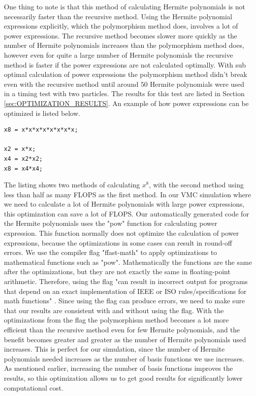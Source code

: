 \documentclass[../main.tex]{subfiles}
\begin{document}
One thing to note is that this method of calculating Hermite polynomials is not necessarily faster than the recursive method. Using the Hermite polynomial expressions explicitly, which the polymorphism method does, involves a lot of power expressions. The recursive method becomes slower more quickly as the number of Hermite polynomials increases than the polymorphism method does, however even for quite a large number of Hermite polynomials the recursive method is faster if the power expressions are not calculated optimally. With sub optimal calculation of power expressions the polymorphism method didn't break even with the recursive method until around $50$ Hermite polynomials were used in a timing test with two particles. The results for this test are listed in Section \ref{sec:OPTIMIZATION_RESULTS}. An example of how power expressions can be optimized is listed below.
\lstset{language=c++}
\begin{lstlisting}[caption={Two methods for calculating $x^8$. The first method uses $7$ FLOPS, while the second method uses only $3$ FLOPS.}]
x8 = x*x*x*x*x*x*x*x;

x2 = x*x;
x4 = x2*x2;
x8 = x4*x4;
\end{lstlisting}
The listing shows two methods of calculating $x^8$, with the second method using less than half as many FLOPS as the first method. In our VMC simulation where we need to calculate a lot of Hermite polynomials with large power expressions, this optimization can save a lot of FLOPS. Our automatically generated code for the Hermite polynomials uses the "pow" function for calculating power expression. This function normally does not optimize the calculation of power expressions, because the optimizations in some cases can result in round-off errors. We use the compiler flag "ffast-math" to apply optimizations to mathematical functions such as "pow". Mathematically the functions are the same after the optimizations, but they are not exactly the same in floating-point arithmetic. Therefore, using the flag "can result in incorrect output for programs that depend on an exact implementation of IEEE or ISO rules/specifications for math functions" \cite{gccDocs}. Since using the flag can produce errors, we need to make sure that our results are consistent with and without using the flag. With the optimizations from the flag the polymorphism method becomes a lot more efficient than the recursive method even for few Hermite polynomials, and the benefit becomes greater and greater as the number of Hermite polynomials used increases. This is perfect for our simulation, since the number of Hermite polynomials needed increases as the number of basis functions we use increases. As mentioned earlier, increasing the number of basis functions improves the results, so this optimization allows us to get good results for significantly lower computational cost.
\end{document}

